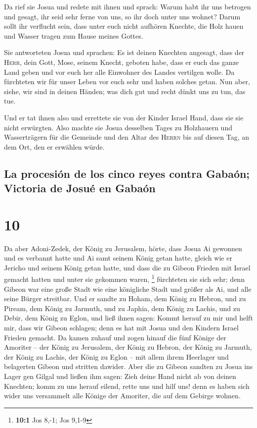  Da rief sie Josua und redete mit ihnen und sprach: Warum
habt ihr uns betrogen und gesagt, ihr seid sehr ferne von uns, so ihr
doch unter uns wohnet?  Darum sollt ihr verflucht sein,
dass unter euch nicht aufhören Knechte, die Holz hauen und Wasser tragen
zum Hause meines Gottes.

 Sie antworteten Josua und sprachen: Es ist deinen
Knechten angesagt, dass der \textsc{Herr}, dein Gott, Mose, seinem
Knecht, geboten habe, dass er euch das ganze Land geben und vor euch her
alle Einwohner des Landes vertilgen wolle. Da fürchteten wir für unser
Leben vor euch sehr und haben solches getan.  Nun aber,
siehe, wir sind in deinen Händen; was dich gut und recht dünkt uns zu
tun, das tue.

 Und er tat ihnen also und errettete sie von der Kinder
Israel Hand, dass sie sie nicht erwürgten.  Also machte
sie Josua desselben Tages zu Holzhauern und Wasserträgern für die
Gemeinde und den Altar des \textsc{Herrn} bis auf diesen Tag, an dem
Ort, den er erwählen würde.

\hypertarget{la-procesiuxf3n-de-los-cinco-reyes-contra-gabauxf3n-victoria-de-josuuxe9-en-gabauxf3n}{%
\subsection{La procesión de los cinco reyes contra Gabaón; Victoria de
Josué en
Gabaón}\label{la-procesiuxf3n-de-los-cinco-reyes-contra-gabauxf3n-victoria-de-josuuxe9-en-gabauxf3n}}

\hypertarget{section-9}{%
\section{10}\label{section-9}}

 Da aber Adoni-Zedek, der König zu Jerusalem, hörte, dass
Josua Ai gewonnen und es verbannt hatte und Ai samt seinem König getan
hatte, gleich wie er Jericho und seinem König getan hatte, und dass die
zu Gibeon Frieden mit Israel gemacht hatten und unter sie gekommen
waren, \footnote{\textbf{10:1} Jos 8,-1; Jos 9,1-9} 
fürchteten sie sich sehr; denn Gibeon war eine große Stadt wie eine
königliche Stadt und größer als Ai, und alle seine Bürger streitbar.
 Und er sandte zu Hoham, dem König zu Hebron, und zu
Piream, dem König zu Jarmuth, und zu Japhia, dem König zu Lachis, und zu
Debir, dem König zu Eglon, und ließ ihnen sagen:  Kommt
herauf zu mir und helft mir, dass wir Gibeon schlagen; denn es hat mit
Josua und den Kindern Israel Frieden gemacht.  Da kamen
zuhauf und zogen hinauf die fünf Könige der Amoriter -- der König zu
Jerusalem, der König zu Hebron, der König zu Jarmuth, der König zu
Lachis, der König zu Eglon -- mit allem ihrem Heerlager und belagerten
Gibeon und stritten dawider.  Aber die zu Gibeon sandten
zu Josua ins Lager gen Gilgal und ließen ihm sagen: Zieh deine Hand
nicht ab von deinen Knechten; komm zu uns herauf eilend, rette uns und
hilf uns! denn es haben sich wider uns versammelt alle Könige der
Amoriter, die auf dem Gebirge wohnen.

